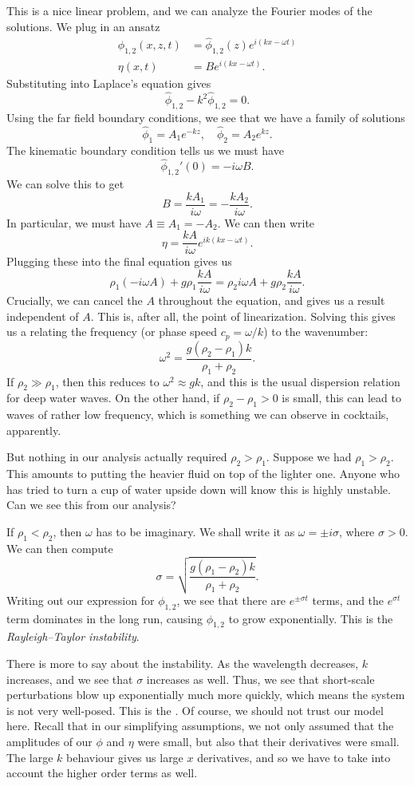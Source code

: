 \documentclass[a4paper]{article}
\begin{document}
This is a nice linear problem, and we can analyze the Fourier modes of the solutions. We plug in an ansatz
\begin{align*}
  \phi_{1, 2}(x, z, t) &= \hat{\phi}_{1, 2}(z) e^{i(kx - \omega t)}\\
  \eta(x, t) &= B e^{i(kx - \omega t)}.
\end{align*}
Substituting into Laplace's equation gives
\[
  \hat{\phi}_{1, 2} - k^2 \hat{\phi}_{1, 2} = 0.
\]
Using the far field boundary conditions, we see that we have a family of solutions
\[
  \hat{\phi}_1 = A_1 e^{-kz},\quad \hat{\phi}_2 = A_2 e^{kz}.
\]
The kinematic boundary condition tells us we must have
\[
  \hat{\phi}_{1, 2}'(0) = -i\omega B.
\]
We can solve this to get
\[
  B = \frac{k A_1}{i \omega} = - \frac{kA_2}{ i \omega}.
\]
In particular, we must have $A \equiv A_1 = - A_2$. We can then write
\[
  \eta = \frac{kA}{i\omega} e^{ik(kx - \omega t)}.
\]
Plugging these into the final equation gives us
\[
  \rho_1 (-i\omega A) + g \rho_1 \frac{k A}{i \omega} = \rho_2 i \omega A + g \rho_2 \frac{kA}{i \omega}.
\]
Crucially, we can cancel the $A$ throughout the equation, and gives us a result independent of $A$. This is, after all, the point of linearization. Solving this gives us a  relating the frequency (or phase speed $c_p = \omega/k$) to the wavenumber:
\[
  \omega^2 = \frac{g(\rho_2 - \rho_1)k}{\rho_1 + \rho_2}.
\]
If $\rho_2 \gg \rho_1$, then this reduces to $\omega^2 \approx gk$, and this is the usual dispersion relation for deep water waves. On the other hand, if $\rho_2 - \rho_1 > 0$ is small, this can lead to waves of rather low frequency, which is something we can observe in cocktails, apparently.

But nothing in our analysis actually required $\rho_2 > \rho_1$. Suppose we had $\rho_1 > \rho_2$. This amounts to putting the heavier fluid on top of the lighter one. Anyone who has tried to turn a cup of water upside down will know this is highly unstable. Can we see this from our analysis?

If $\rho_1 < \rho_2$, then $\omega$ has to be imaginary. We shall write it as $\omega = \pm i \sigma$, where $\sigma > 0$. We can then compute
\[
  \sigma = \sqrt{\frac{g(\rho_1 - \rho_2)k}{\rho_1 + \rho_2}}.
\]
Writing out our expression for $\phi_{1, 2}$, we see that there are $e^{\pm \sigma t}$ terms, and the $e^{\sigma t}$ term dominates in the long run, causing $\phi_{1, 2}$ to grow exponentially. This is the \emph{Rayleigh--Taylor instability}.

There is more to say about the instability. As the wavelength decreases, $k$ increases, and we see that $\sigma$ increases as well. Thus, we see that short-scale perturbations blow up exponentially much more quickly, which means the system is not very well-posed. This is the . Of course, we should not trust our model here. Recall that in our simplifying assumptions, we not only assumed that the amplitudes of our $\phi$ and $\eta$ were small, but also that their derivatives were small. The large $k$ behaviour gives us large $x$ derivatives, and so we have to take into account the higher order terms as well.
\end{document}
